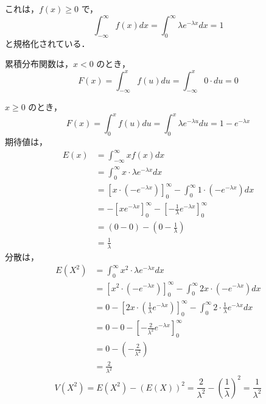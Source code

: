 \documentclass[titlepage,a4paper]{jsarticle}
\begin{document}
これは，\( f(x) \geq 0 \) で，
\[
  \int_{-\infty}^\infty f(x) dx = \int_0^\infty \lambda e^{-\lambda x} dx = 1
\]
と規格化されている．

累積分布関数は，\( x < 0 \) のとき，
\[
  F(x) = \int_{-\infty}^x f(u) du = \int_{-\infty}^x 0 \cdot du = 0
\]

\( x \geq 0 \) のとき，
\[
  F(x) = \int_0^x f(u) du = \int_0^x \lambda e^{-\lambda u} du = 1 - e^{-\lambda x}
\]
期待値は，
\begin{align*}
  E(x) & = \int_{-\infty}^\infty x f(x) dx                                                                       \\
       & = \int_0^\infty x \cdot \lambda e^{-\lambda x} dx                                                       \\
       & = \left[ x \cdot (-e^{-\lambda x}) \right]_0^\infty - \int_0^\infty 1 \cdot (-e^{-\lambda x}) dx        \\
       & = -\left[ x e^{-\lambda x} \right]_0^\infty - \left[ -\frac{1}{\lambda} e^{-\lambda x} \right]_0^\infty \\
       & = \left( 0 - 0 \right) - \left( 0 - \frac{1}{\lambda} \right)                                           \\
       & = \frac{1}{\lambda}
\end{align*}
分散は，
\begin{align*}
  E(X^2) & = \int_0^\infty x^2 \cdot \lambda e^{-\lambda x} dx                                                                                                \\
         & = \left[ x^2 \cdot (-e^{-\lambda x}) \right]_0^\infty - \int_0^\infty 2x \cdot (-e^{-\lambda x}) dx                                                \\
         & = 0 - \left[ 2x \cdot \left( \frac{1}{\lambda} e^{-\lambda x} \right) \right]_0^\infty - \int_0^\infty 2 \cdot \frac{1}{\lambda} e^{-\lambda x} dx \\
         & = 0 - 0 - \left[ -\frac{2}{\lambda^2} e^{-\lambda x} \right]_0^\infty                                                                              \\
         & = 0 - \left( -\frac{2}{\lambda^2} \right)                                                                                                          \\
         & = \frac{2}{\lambda^2}
\end{align*}
\[
  V(X^2) = E(X^2) - (E(X))^2 = \frac{2}{\lambda^2} - \left( \frac{1}{\lambda} \right)^2 = \frac{1}{\lambda^2}
\]
\end{document}
